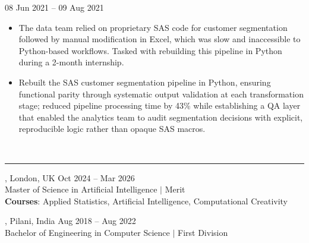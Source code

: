 \documentclass[9pt]{extarticle}
\begin{document}
{    \vspace{5pt}
     \hfill 08 Jun 2021 -- 09 Aug 2021
    \begin{itemize}[leftmargin=*]
        \item The data team relied on proprietary SAS code for customer segmentation followed by manual modification in Excel, which was slow and inaccessible to Python-based workflows. Tasked with rebuilding this pipeline in Python during a 2-month internship.
        \item Rebuilt the SAS customer segmentation pipeline in Python, ensuring functional parity through systematic output validation at each transformation stage; reduced pipeline processing time by 43\% while establishing a QA layer that enabled the analytics team to audit segmentation decisions with explicit, reproducible logic rather than opaque SAS macros.
    \end{itemize}

    \vspace{10pt}
     \\
    \vspace{-7pt}
    \hrule
    \vspace{5pt}
    , London, UK \hfill Oct 2024 -- Mar 2026 \\
    {\normalsize Master of Science in Artificial Intelligence $\vert$ Merit} \\
    \textbf{Courses}: Applied Statistics, Artificial Intelligence, Computational Creativity

    \vspace{5pt}
    , Pilani, India \hfill Aug 2018 -- Aug 2022 \\
    {\normalsize Bachelor of Engineering in Computer Science $\vert$ First Division}

}
\end{document}

